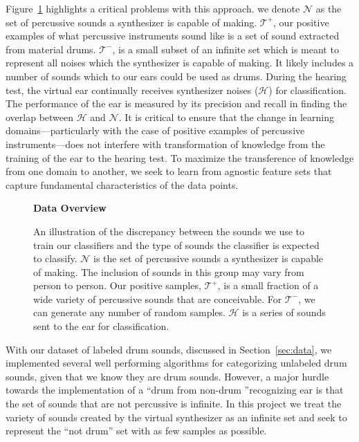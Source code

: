 \documentclass[\main/thesis.tex]{subfiles}
\begin{document}
Figure~\ref{fig:ven_data} highlights a critical problems with this approach. we denote $\mathcal{N}$ as the set of percussive sounds a synthesizer is capable of making. $\mathcal{T^{+}}$, our positive examples of what percussive instruments sound like is a set of sound extracted from material drums. $\mathcal{T^{-}}$, is a small subset of an infinite set which is meant to represent all noises which the synthesizer is capable of making. It likely includes a number of sounds which to our ears could be used as drums. During the hearing test, the virtual ear continually receives synthesizer noises ($\mathcal{H}$) for classification. The performance of the ear is measured by its precision and recall in finding the overlap between $\mathcal{H}$ and $\mathcal{N}$. It is critical to ensure that the change in learning domains---particularly with the case of positive examples of percussive instruments---does not interfere with transformation of knowledge from the training of the ear to the hearing test. To maximize the transference of knowledge from one domain to another, we seek to learn from agnostic feature sets that capture fundamental characteristics of the data points. 
\begin{figure}[]
    \begin{center}
    \textbf{Data Overview}
    \end{center}
    \caption{ An illustration of the discrepancy between the sounds we use to train our classifiers and the type of sounds the classifier is expected to classify. $\mathcal{N}$ is the set of percussive sounds a synthesizer is capable of making. The inclusion of sounds in this group may vary from person to person. Our positive samples, $\mathcal{T^{+}}$, is a small fraction of a wide variety of percussive sounds that are conceivable. For $\mathcal{T^{-}}$, we can generate any number of random samples. $\mathcal{H}$ is a series of sounds sent to the ear for classification.}
\label{fig:ven_data}
\end{figure}
 With our dataset of labeled drum sounds, discussed in Section~\ref{sec:data}, we implemented several well performing algorithms for categorizing unlabeled drum sounds, given that we know they are drum sounds. However, a major hurdle towards the implementation of a \textquotedblleft drum from non-drum \textquotedblright recognizing ear is that the set of sounds that are not percussive is infinite. In this project we treat the variety of sounds created by the virtual synthesizer as an infinite set and seek to represent the \enquote{not drum} set with as few samples as possible.
\end{document}
